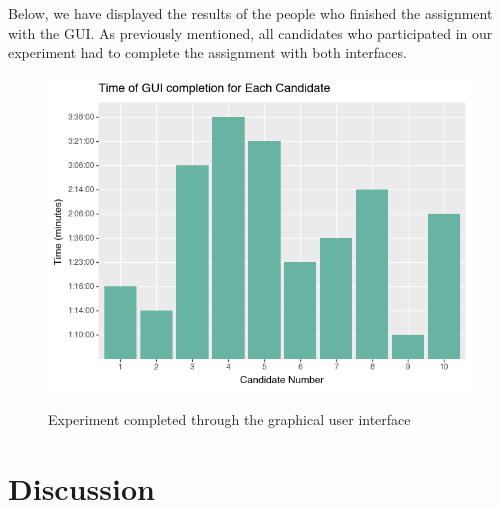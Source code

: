 \documentclass[]{report}
\begin{document}
Below, we have displayed the results of the people who finished the assignment with the GUI. As previously mentioned, all candidates who participated in our experiment had to complete the assignment with both interfaces.
\begin{figure}[H]
	\centering
	\includegraphics[width=0.75\linewidth]{ExperimentGui}\\
	\caption{Experiment completed through the graphical user interface}
	\label{fig: 21}
\end{figure}

	\newpage
	\section{Discussion}
	
\end{document}
